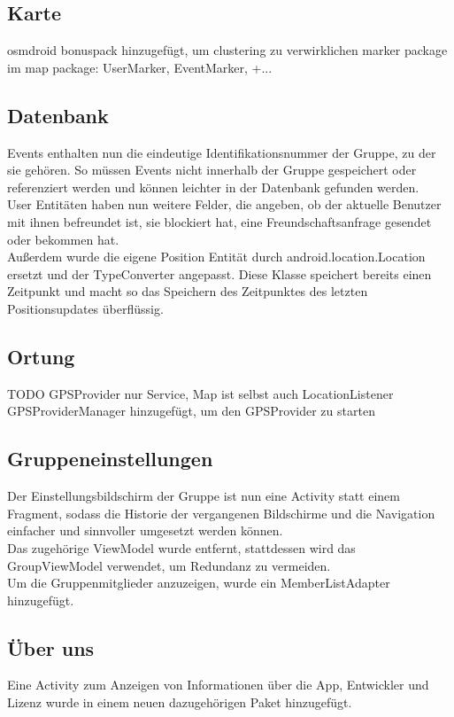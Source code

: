 \documentclass[parskip=full,11pt]{scrartcl}
\begin{document}
\subsection{Karte}
osmdroid bonuspack hinzugefügt, um clustering zu verwirklichen
marker package im map package: UserMarker, EventMarker, +...

\subsection{Datenbank}
Events enthalten nun die eindeutige Identifikationsnummer der Gruppe,
zu der sie gehören. So müssen Events nicht innerhalb der Gruppe
gespeichert oder referenziert werden und können leichter in der
Datenbank gefunden werden.\\
User Entitäten haben nun weitere Felder, die angeben, ob der aktuelle Benutzer
mit ihnen befreundet ist, sie blockiert hat, eine Freundschaftsanfrage
gesendet oder bekommen hat.\\
Außerdem wurde die eigene Position Entität durch android.location.Location
ersetzt und der TypeConverter angepasst. Diese Klasse speichert bereits
einen Zeitpunkt und macht so das Speichern des Zeitpunktes des letzten
Positionsupdates überflüssig.

\subsection{Ortung}
TODO
GPSProvider nur Service, Map ist selbst auch LocationListener
GPSProviderManager hinzugefügt, um den GPSProvider zu starten

\subsection{Gruppeneinstellungen}
Der Einstellungsbildschirm der Gruppe ist nun eine Activity statt einem
Fragment, sodass die Historie der vergangenen Bildschirme und die
Navigation einfacher und sinnvoller umgesetzt werden können.\\
Das zugehörige ViewModel wurde entfernt, stattdessen wird das
GroupViewModel verwendet, um Redundanz zu vermeiden.\\
Um die Gruppenmitglieder anzuzeigen, wurde ein MemberListAdapter
hinzugefügt.

\subsection{Über uns}
Eine Activity zum Anzeigen von Informationen über die App, Entwickler und
Lizenz wurde in einem neuen dazugehörigen Paket hinzugefügt.
\end{document}
